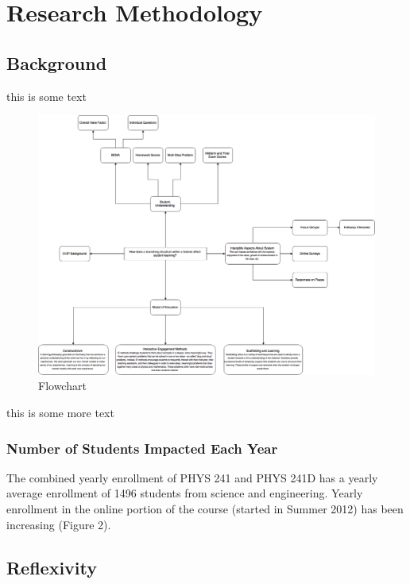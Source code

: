 \chapter[Chapter 3: Research Methodology]{Research Methodology}

\section{Background}

this is some text

\begin{figure}[!htb]
	\centering
	\includegraphics[width=6in]{img/chapter3/flowchart}
	\caption[Flowchart]{Flowchart}
\end{figure}

this is some more text

\subsection{Number of Students Impacted Each Year}

The combined yearly enrollment of PHYS
241 and PHYS 241D has a yearly average
enrollment of 1496 students from science and
engineering. Yearly enrollment in the online
portion of the course (started in Summer 2012)
has been increasing (Figure 2).

\section{Reflexivity}

